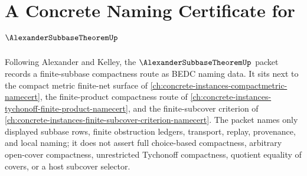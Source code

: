 \chapter{A Concrete Naming Certificate for $\AlexanderSubbaseTheoremUp$}
\label{ch:concrete-instances-alexander-subbase-theorem-namecert}

Following Alexander and Kelley, the $\AlexanderSubbaseTheoremUp$ packet records a finite-subbase compactness route as BEDC naming data. It sits next to the compact metric finite-net surface of \autoref{ch:concrete-instances-compactmetric-namecert}, the finite-product compactness route of \autoref{ch:concrete-instances-tychonoff-finite-product-namecert}, and the finite-subcover criterion of \autoref{ch:concrete-instances-finite-subcover-criterion-namecert}. The packet names only displayed subbase rows, finite obstruction ledgers, transport, replay, provenance, and local naming; it does not assert full choice-based compactness, arbitrary open-cover compactness, unrestricted Tychonoff compactness, quotient equality of covers, or a host subcover selector.

